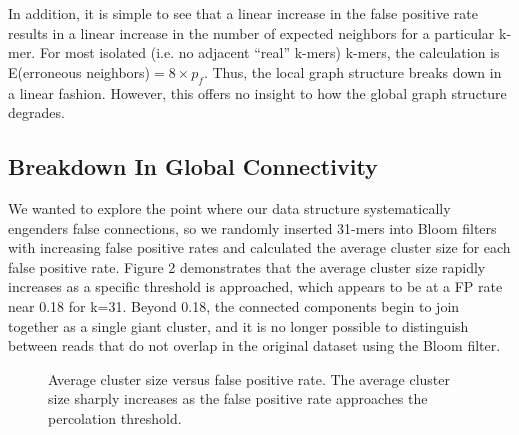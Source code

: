 \documentclass[12pt]{article} \usepackage{simplemargins}
\begin{document}
In addition, it is simple to see that a linear increase in the false 
positive rate results in a linear increase in the number of expected 
neighbors for a particular k-mer. For most isolated (i.e. no adjacent 
``real'' k-mers) k-mers, the calculation is 
E(erroneous neighbors)$ = 8 \times p_f$. Thus, the local graph 
structure breaks down in a linear fashion. However, this offers no insight 
to how the global graph structure degrades.

\subsection{Breakdown In Global Connectivity}
We wanted to explore the point where our data structure systematically 
engenders false connections, 
so we randomly inserted 31-mers into Bloom
filters with increasing false positive rates and calculated the average
cluster size for each false positive rate. Figure 2 demonstrates that 
the average cluster
size rapidly increases as a specific threshold is approached,
which appears to be at a FP rate near 0.18 for k=31. Beyond 0.18, 
the connected components begin to join together as a single giant 
cluster, and it is no longer possible to distinguish between reads 
that do not overlap in the original dataset using the Bloom filter.

\begin{figure}
\caption{Average cluster size versus false positive rate. The average 
cluster size sharply increases as the false positive 
rate approaches the percolation threshold.
}
\end{figure}
\end{document}
